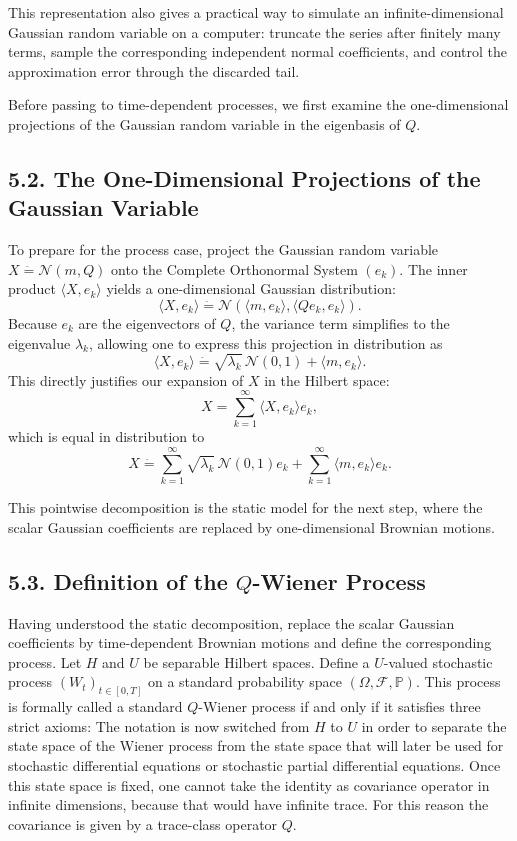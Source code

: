 \documentclass[11pt]{article}
\theoremstyle{definition}
\theoremstyle{remark}
\begin{document}
This representation also gives a practical way to simulate an infinite-dimensional Gaussian random variable on a computer: truncate the series after finitely many terms, sample the corresponding independent normal coefficients, and control the approximation error through the discarded tail.

Before passing to time-dependent processes, we first examine the one-dimensional projections of the Gaussian random variable in the eigenbasis of \(Q\).

\subsection*{5.2. The One-Dimensional Projections of the Gaussian Variable}
To prepare for the process case, project the Gaussian random variable \(X\stackrel{\hat{\ }}{=}\mathcal N(m,Q)\) onto the Complete Orthonormal System \((e_k)\). The inner product \(\langle X,e_k\rangle\) yields a one-dimensional Gaussian distribution:
\[
\langle X,e_k\rangle\stackrel{\hat{\ }}{=}\mathcal N(\langle m,e_k\rangle,\langle Qe_k,e_k\rangle).
\]
Because \(e_k\) are the eigenvectors of \(Q\), the variance term simplifies to the eigenvalue \(\lambda_k\), allowing one to express this projection in distribution as
\[
\langle X,e_k\rangle\stackrel{\hat{\ }}{=}\sqrt{\lambda_k}\,\mathcal N(0,1)+\langle m,e_k\rangle.
\]
This directly justifies our expansion of \(X\) in the Hilbert space:
\[
X=\sum_{k=1}^\infty \langle X,e_k\rangle e_k,
\]
which is equal in distribution to
\[
X\stackrel{\hat{\ }}{=}\sum_{k=1}^\infty \sqrt{\lambda_k}\,\mathcal N(0,1)e_k+\sum_{k=1}^\infty \langle m,e_k\rangle e_k.
\]

This pointwise decomposition is the static model for the next step, where the scalar Gaussian coefficients are replaced by one-dimensional Brownian motions.

\subsection*{5.3. Definition of the \(Q\)-Wiener Process}
Having understood the static decomposition, replace the scalar Gaussian coefficients by time-dependent Brownian motions and define the corresponding process. Let \(H\) and \(U\) be separable Hilbert spaces. Define a \(U\)-valued stochastic process \((W_t)_{t\in[0,T]}\) on a standard probability space \((\Omega,\mathcal F,\mathbb P)\). This process is formally called a standard \(Q\)-Wiener process if and only if it satisfies three strict axioms:
The notation is now switched from \(H\) to \(U\) in order to separate the state space of the Wiener process from the state space that will later be used for stochastic differential equations or stochastic partial differential equations. Once this state space is fixed, one cannot take the identity as covariance operator in infinite dimensions, because that would have infinite trace. For this reason the covariance is given by a trace-class operator \(Q\).
\end{document}
